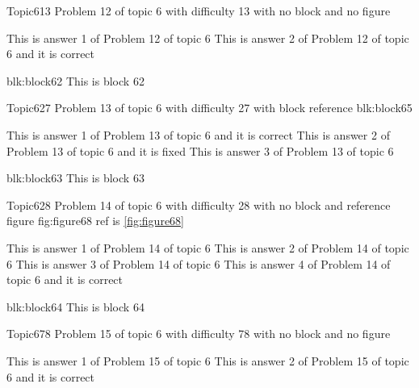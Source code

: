 \documentclass[master]{exam}
\begin{document}
\begin{problem}{Topic6}{13}
	Problem 12 of topic 6 with difficulty 13 with no block and no figure
	\begin{answers}
		\answer This is answer 1 of Problem 12 of topic 6 
		\answer[correct] This is answer 2 of Problem 12 of topic 6 and it is correct
	\end{answers}
\end{problem}



\begin{block}{blk:block62}
This is block 62
\end{block}


\begin{problem}[requires=blk:block65]{Topic6}{27}
	Problem 13 of topic 6 with difficulty 27 with block reference blk:block65
	\begin{answers}
		\answer[correct] This is answer 1 of Problem 13 of topic 6 and it is correct
		\answer[fixed] This is answer 2 of Problem 13 of topic 6 and it is fixed
		\answer This is answer 3 of Problem 13 of topic 6 
	\end{answers}
\end{problem}



\begin{block}{blk:block63}
This is block 63
\end{block}


\begin{problem}{Topic6}{28}
	Problem 14 of topic 6 with difficulty 28 with no block and reference figure fig:figure68 ref is \ref{fig:figure68}
	\begin{answers}
		\answer This is answer 1 of Problem 14 of topic 6 
		\answer This is answer 2 of Problem 14 of topic 6 
		\answer This is answer 3 of Problem 14 of topic 6 
		\answer[correct] This is answer 4 of Problem 14 of topic 6 and it is correct
	\end{answers}
\end{problem}



\begin{block}{blk:block64}
This is block 64
\end{block}


\begin{problem}{Topic6}{78}
	Problem 15 of topic 6 with difficulty 78 with no block and no figure
	\begin{answers}
		\answer This is answer 1 of Problem 15 of topic 6 
		\answer[correct] This is answer 2 of Problem 15 of topic 6 and it is correct
	\end{answers}
\end{problem}
\end{document}
